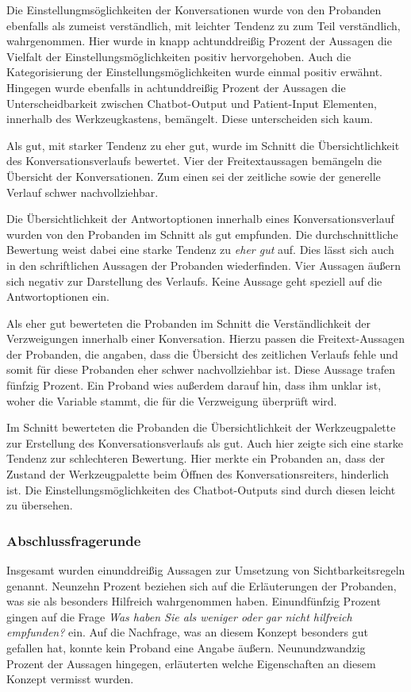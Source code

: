Die Einstellungmsöglichkeiten der Konversationen wurde von den Probanden ebenfalls als zumeist verständlich, mit leichter Tendenz zu zum Teil verständlich, wahrgenommen. Hier wurde in knapp achtunddreißig Prozent der Aussagen die Vielfalt der Einstellungsmöglichkeiten positiv hervorgehoben. Auch die Kategorisierung der Einstellungsmöglichkeiten wurde einmal positiv erwähnt. Hingegen wurde ebenfalls in achtunddreißig Prozent der Aussagen die Unterscheidbarkeit zwischen Chatbot-Output und Patient-Input Elementen, innerhalb des Werkzeugkastens, bemängelt. Diese unterscheiden sich kaum. 

Als gut, mit starker Tendenz zu eher gut, wurde im Schnitt die Übersichtlichkeit des Konversationsverlaufs bewertet. Vier der Freitextaussagen bemängeln die Übersicht der Konversationen. Zum einen sei der zeitliche sowie der generelle Verlauf schwer nachvollziehbar.

Die Übersichtlichkeit der Antwortoptionen innerhalb eines Konversationsverlauf wurden von den Probanden im Schnitt als gut empfunden. Die durchschnittliche Bewertung weist dabei eine starke Tendenz zu \emph{eher gut} auf. Dies lässt sich auch in den schriftlichen Aussagen der Probanden wiederfinden. Vier Aussagen äußern sich negativ zur Darstellung des Verlaufs. Keine Aussage geht speziell auf die Antwortoptionen ein. 

Als eher gut bewerteten die Probanden im Schnitt die Verständlichkeit der Verzweigungen innerhalb einer Konversation. Hierzu passen die Freitext-Aussagen der Probanden, die angaben, dass die Übersicht des zeitlichen Verlaufs fehle und somit für diese Probanden eher schwer nachvollziehbar ist. Diese Aussage trafen fünfzig Prozent. Ein Proband wies außerdem darauf hin, dass ihm unklar ist, woher die Variable stammt, die für die Verzweigung überprüft wird. 

Im Schnitt bewerteten die Probanden die Übersichtlichkeit der Werkzeugpalette zur Erstellung des Konversationsverlaufs als gut. Auch hier zeigte sich eine starke Tendenz zur schlechteren Bewertung. Hier merkte ein Probanden an, dass der Zustand der Werkzeugpalette beim Öffnen des Konversationsreiters, hinderlich ist. Die Einstellungsmöglichkeiten des Chatbot-Outputs sind durch diesen leicht zu übersehen. 

\subsubsection{Abschlussfragerunde}
Insgesamt wurden einunddreißig Aussagen zur Umsetzung von Sichtbarkeitsregeln genannt. Neunzehn Prozent beziehen sich auf die Erläuterungen der Probanden, was sie als besonders Hilfreich wahrgenommen haben. Einundfünfzig Prozent gingen auf die Frage \emph{Was haben Sie als weniger oder gar nicht hilfreich empfunden?} ein. Auf die Nachfrage, was an diesem Konzept besonders gut gefallen hat, konnte kein Proband eine Angabe äußern. Neunundzwandzig Prozent der Aussagen hingegen, erläuterten welche Eigenschaften an diesem Konzept vermisst wurden.


